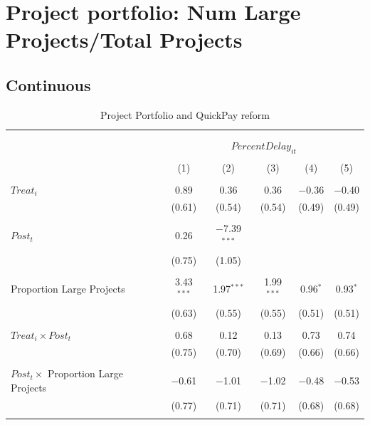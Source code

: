 \documentclass[
]{article}
\begin{document}
\hypertarget{project-portfolio-num-large-projectstotal-projects}{%
\section{Project portfolio: Num Large Projects/Total
Projects}\label{project-portfolio-num-large-projectstotal-projects}}

\hypertarget{continuous}{%
\subsection{Continuous}\label{continuous}}

\begin{table}[H] \centering 
  \caption{Project Portfolio and QuickPay reform} 
  \label{} 
\small 
\begin{tabular}{@{\extracolsep{-2pt}}lccccc} 
\\[-1.8ex]\hline 
\hline \\[-1.8ex] 
\\[-1.8ex] & \multicolumn{5}{c}{$PercentDelay_{it}$  } \\ 
\\[-1.8ex] & (1) & (2) & (3) & (4) & (5)\\ 
\hline \\[-1.8ex] 
 $Treat_i$ & 0.89 & 0.36 & 0.36 & $-$0.36 & $-$0.40 \\ 
  & (0.61) & (0.54) & (0.54) & (0.49) & (0.49) \\ 
  & & & & & \\ 
 $Post_t$ & 0.26 & $-$7.39$^{***}$ &  &  &  \\ 
  & (0.75) & (1.05) &  &  &  \\ 
  & & & & & \\ 
 Proportion Large Projects & 3.43$^{***}$ & 1.97$^{***}$ & 1.99$^{***}$ & 0.96$^{*}$ & 0.93$^{*}$ \\ 
  & (0.63) & (0.55) & (0.55) & (0.51) & (0.51) \\ 
  & & & & & \\ 
 $Treat_i \times Post_t$ & 0.68 & 0.12 & 0.13 & 0.73 & 0.74 \\ 
  & (0.75) & (0.70) & (0.69) & (0.66) & (0.66) \\ 
  & & & & & \\ 
 $Post_t \times$ Proportion Large Projects & $-$0.61 & $-$1.01 & $-$1.02 & $-$0.48 & $-$0.53 \\ 
  & (0.77) & (0.71) & (0.71) & (0.68) & (0.68) \\ 
  & & & & & \\ 

\end{tabular}
\end{table}
\end{document}
